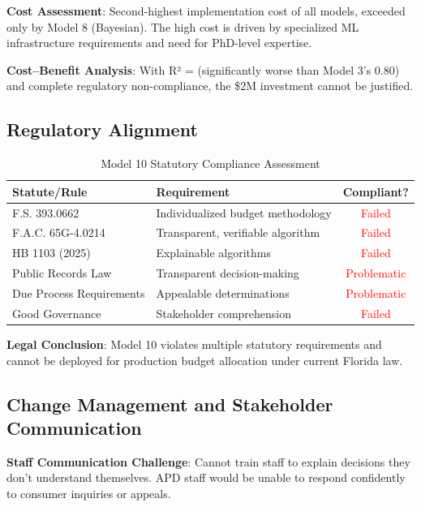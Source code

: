 \textbf{Cost Assessment}: Second-highest implementation cost of all models, exceeded only by Model 8 (Bayesian). The high cost is driven by specialized ML infrastructure requirements and need for PhD-level expertise.

\textbf{Cost--Benefit Analysis}: With R² = \ModelTenRSquaredTest{} (significantly worse than Model 3's 0.80) and complete regulatory non-compliance, the \$2M investment cannot be justified.

\subsection{Regulatory Alignment}

\begin{table}[h]
\centering
\caption{Model 10 Statutory Compliance Assessment}
\begin{tabular}{llc}
\toprule
\textbf{Statute/Rule} & \textbf{Requirement} & \textbf{Compliant?} \\
\midrule
F.S. 393.0662 & Individualized budget methodology & \textcolor{red}{ Failed} \\
F.A.C. 65G-4.0214 & Transparent, verifiable algorithm & \textcolor{red}{ Failed} \\
HB 1103 (2025) & Explainable algorithms & \textcolor{red}{ Failed} \\
Public Records Law & Transparent decision-making & \textcolor{red}{ Problematic} \\
Due Process Requirements & Appealable determinations & \textcolor{red}{ Problematic} \\
Good Governance & Stakeholder comprehension & \textcolor{red}{ Failed} \\
\bottomrule
\end{tabular}
\end{table}

\textbf{Legal Conclusion}: Model 10 violates multiple statutory requirements and cannot be deployed for production budget allocation under current Florida law.

\subsection{Change Management and Stakeholder Communication}

\textbf{Staff Communication Challenge}: Cannot train staff to explain decisions they don't understand themselves. APD staff would be unable to respond confidently to consumer inquiries or appeals.

